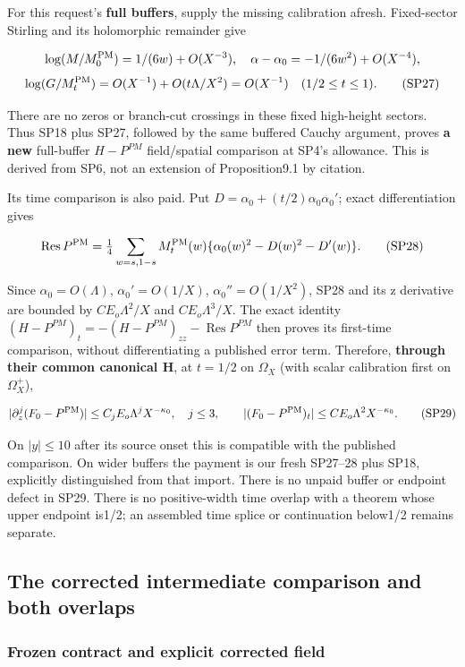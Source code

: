 For this request's \textbf{full buffers}, supply the missing calibration afresh. Fixed-sector Stirling and its holomorphic remainder give

\[
\log(M/M^{\rm PM}_0)=1/(6w)+O(X^{-3}),\quad
\alpha-\alpha_0=-1/(6w^2)+O(X^{-4}),
\]
\[
\log(G/M^{\rm PM}_t)=O(X^{-1})+O(t\Lambda/X^2)=O(X^{-1})
\quad(1/2\le t\le1).
\tag{SP27}\label{eq:ansatz-sp27}
\]

There are no zeros or branch-cut crossings in these fixed high-height sectors. Thus SP18 plus SP27, followed by the same buffered Cauchy argument, proves \textbf{a new} full-buffer \(H-P^{PM}\) field/spatial comparison at SP4's allowance. This is derived from SP6, not an extension of Proposition9.1 by citation.

Its time comparison is also paid. Put \(D=\alpha_0+(t/2)\alpha_0 \alpha_0'\); exact differentiation gives

\[
\operatorname{Res}P^{\rm PM}
 =\tfrac14\sum_{w=s,1-s}M^{\rm PM}_t(w)
       \{\alpha_0(w)^2-D(w)^2-D'(w)\}.
\tag{SP28}\label{eq:ansatz-sp28}
\]

Since \(\alpha_0=O(\Lambda)\), \(\alpha_0'=O(1/X)\), \(\alpha_0''=O(1/X^{2})\), SP28 and its z derivative are bounded by \(C E_{o} \Lambda^{2}/X\) and \(C E_{o} \Lambda^{3}/X\). The exact identity \((H-P^{PM})_{t}=-(H-P^{PM})_{zz}-\operatorname{Res} P^{PM}\) then proves its first-time comparison, without differentiating a published error term. Therefore, \textbf{through their common canonical H}, at \(t=1/2\) on \(\Omega_{X}\) (with scalar calibration first on \(\Omega_{X}^+\)),

\[
|\partial_z^j(F_0-P^{\rm PM})|\le C_jE_o\Lambda^jX^{-\kappa_0},
\quad j\le3,\qquad
|(F_0-P^{\rm PM})_t|\le C E_o\Lambda^2X^{-\kappa_0}.
\tag{SP29}\label{eq:ansatz-sp29}
\]

On \(|y|\le 10\) after its source onset this is compatible with the published comparison. On wider buffers the payment is our fresh SP27--28 plus SP18, explicitly distinguished from that import. There is no unpaid buffer or endpoint defect in SP29. There is no positive-width time overlap with a theorem whose upper endpoint is1/2; an assembled time splice or continuation below1/2 remains separate.

\subsection{The corrected intermediate comparison and both overlaps}
\label{sec:intermediate-positive}
\subsubsection{Frozen contract and explicit corrected field}
\label{subsec:ip-1}

